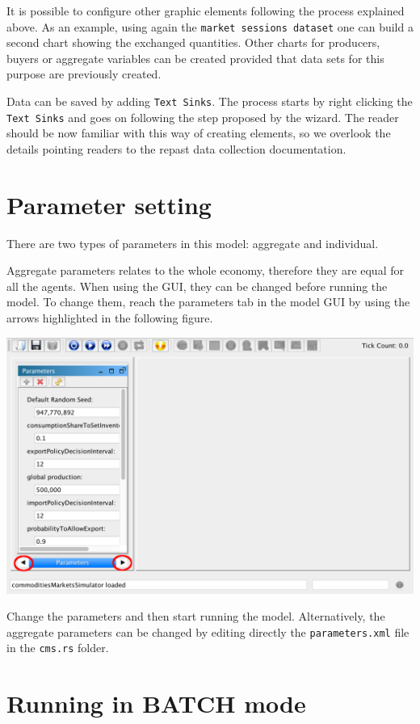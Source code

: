 \documentclass{article}
\begin{document}
It is possible to configure other graphic elements following the process explained above. As an example, using again the \verb+market sessions dataset+ one can build a second chart showing the exchanged quantities. 
Other charts for producers, buyers or aggregate variables can be created provided that data sets for this purpose are previously created. 

Data can be saved by adding \verb+Text Sinks+. The process starts by right clicking the \verb+Text Sinks+ and goes on following the step proposed by the wizard. The reader should be now familiar with this way of creating elements, so we overlook the details pointing readers to the repast data collection documentation. 


\section{Parameter setting}\label{sec:parameters}

There are two types of parameters in this model: aggregate and individual. 

Aggregate parameters relates to the whole economy, therefore they are equal for all the agents. When using the GUI, they can be changed before running the model. To change them, reach the parameters tab in the model GUI by using the arrows highlighted in the following figure.

\includegraphics[scale=0.35]{fig_cms_rs_parameters}

Change the parameters and then start running the model. Alternatively, the aggregate parameters can be changed by editing directly the \verb+parameters.xml+ file in the \verb+cms.rs+ folder.


\section{Running in BATCH mode}
\end{document}
